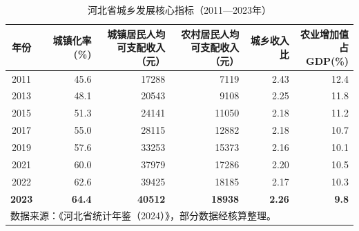 \documentclass[12pt, a4paper, twoside]{ctexart}
\begin{document}
\begin{table}[H]
  \centering
  \caption{河北省城乡发展核心指标（2011—2023年）}
  \label{tab:overview}
  \begin{tabular}{c r
      r r
      r  r}
    \toprule
    \rowcolor{TableHead}
    \color{white}\bfseries 年份 &
    \color{white}\bfseries 城镇化率 (\%) &
    \color{white}\bfseries\makecell{城镇居民人均\\可支配收入（元）} &
    \color{white}\bfseries\makecell{农村居民人均\\可支配收入（元）} &
    \color{white}\bfseries 城乡收入比 &
    \color{white}\bfseries\makecell{农业增加值\\占GDP(\%)} \\
    \midrule
    2011 & 45.6 & 17288 & 7119  & 2.43 & 12.4 \\
    \rowcolor{TableRow}
    2013 & 48.1 & 20543 & 9108  & 2.25 & 11.8 \\
    2015 & 51.3 & 24141 & 11050 & 2.18 & 11.2 \\
    \rowcolor{TableRow}
    2017 & 55.0 & 28115 & 12882 & 2.18 & 10.7 \\
    2019 & 57.6 & 33253 & 15373 & 2.16 & 10.1 \\
    \rowcolor{TableRow}
    2021 & 60.0 & 37979 & 17286 & 2.20 & 10.5 \\
    2022 & 62.6 & 39425 & 18185 & 2.17 & 10.3 \\
    \rowcolor{TableRow}
    \bfseries 2023 & \bfseries 64.4 & \bfseries 40512 &
    \bfseries 18938 & \bfseries 2.26 & \bfseries 9.8 \\
    \bottomrule
    \multicolumn{6}{l}{\footnotesize 数据来源：《河北省统计年鉴（2024）》，部分数据经核算整理。}
  \end{tabular}
\end{table}
\end{document}
